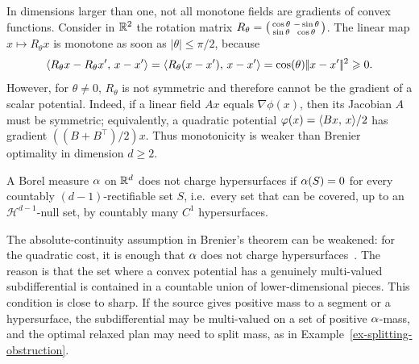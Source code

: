 \begin{rem}
	In dimensions larger than one, not all monotone fields are gradients of convex functions. Consider in $\mathbb{R}^2$ the rotation matrix
	$R_\theta=\begin{psmallmatrix}
	\cos\theta & -\sin\theta\\
	\sin\theta & \cos\theta
	\end{psmallmatrix}$.
	The linear map $x\mapsto R_\theta x$ is monotone as soon as $|\theta|\leq\pi/2$, because
	\[
		\langle R_\theta x-R_\theta x',\,x-x'\rangle
		=
		\langle R_\theta(x-x'),\,x-x'\rangle
		=
		\cos(\theta)|\!| x-x' |\!|^2\geqslant0.
	\]
	However, for $\theta\neq0$, $R_\theta$ is not symmetric and therefore cannot be the gradient of a scalar potential. Indeed, if a linear field $Ax$ equals $\nabla\phi(x)$, then its Jacobian $A$ must be symmetric; equivalently, a quadratic potential $\varphi(x)=\langle Bx,\,x\rangle/2$ has gradient $((B+B^\top)/2)x$. Thus monotonicity is weaker than Brenier optimality in dimension $d\geq2$.
\end{rem}

\begin{defn}\label{defn-not-charging-hypersurfaces}
	A Borel measure $\alpha$ on $\mathbb{R}^d$ does not charge hypersurfaces if $\alpha(S)=0$ for every countably $(d-1)$-rectifiable set $S$, i.e.\ every set that can be covered, up to an $\mathcal H^{d-1}$-null set, by countably many $C^1$ hypersurfaces.
\end{defn}

\begin{rem}
	The absolute-continuity assumption in Brenier's theorem can be weakened: for the quadratic cost, it is enough that $\alpha$ does not charge hypersurfaces~\cite{gangbo1996geometry,Villani09,SantambrogioBook}. The reason is that the set where a convex potential has a genuinely multi-valued subdifferential is contained in a countable union of lower-dimensional pieces. This condition is close to sharp. If the source gives positive mass to a segment or a hypersurface, the subdifferential may be multi-valued on a set of positive $\alpha$-mass, and the optimal relaxed plan may need to split mass, as in Example~\ref{ex-splitting-obstruction}.
\end{rem}

